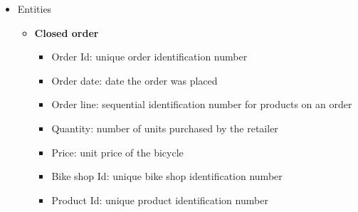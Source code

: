 \documentclass[
  ignorenonframetext,
]{beamer}
\providecommand{\tightlist}{%
  \setlength{\itemsep}{0pt}\setlength{\parskip}{0pt}}\usepackage{longtable,booktabs,array}
\begin{document}
\begin{frame}{}
\label{section-7}
\begin{itemize}
\item
  Entities

  \begin{itemize}
  \item
    \textbf{Closed order}

    \begin{itemize}
    \tightlist
    \item
      Order Id: unique order identification number
    \item
      Order date: date the order was placed
    \item
      Order line: sequential identification number for products on an
      order
    \item
      Quantity: number of units purchased by the retailer
    \item
      Price: unit price of the bicycle
    \item
      Bike shop Id: unique bike shop identification number
    \item
      Product Id: unique product identification number
    \end{itemize}
  \end{itemize}
\end{itemize}
\end{frame}

\end{document}
